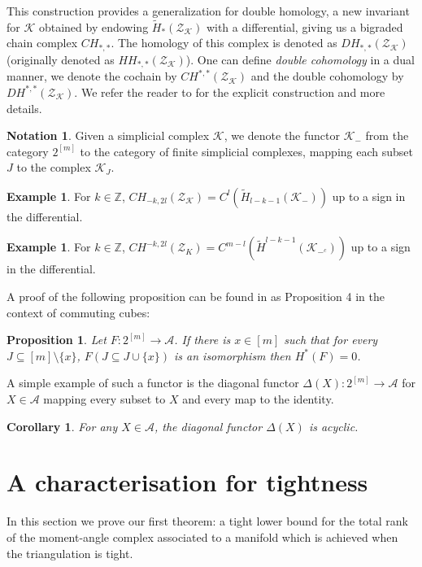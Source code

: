 \documentclass[a4paper]{amsart}
\newtheorem{prop}[thm]{Proposition}
\newtheorem{cor}[thm]{Corollary}
\theoremstyle{definition}
\newtheorem{exm}[thm]{Example}
\newtheorem{notation}[thm]{Notation}
\def\Z{\mathbb{Z}}    %
\def\K{\mathcal{K}}
\def\H{\tilde{H}}
\def\A{\mathcal{A}}
\def\ZZ{\mathcal{Z}}
\def\Z{\mathbb{Z}}
\begin{document}
This construction provides a generalization for double homology, a new invariant for $\K$ obtained by endowing $\H_*(\ZZ_\K)$ with a differential, giving us a bigraded chain complex $CH_{*,*}$. The homology of this complex is denoted as $DH_{*,*}(\ZZ_\K)$ (originally denoted as $HH_{*,*}(\ZZ_\K)$). One can define \textit{double cohomology} in a dual manner, we denote the cochain by $CH^{*,*}(\ZZ_\K)$ and the double cohomology by $DH^{*,*}(\ZZ_\K)$. We refer the reader to \cite{Limonchenko_2023} for the explicit construction and more details.
\begin{notation}
    Given a simplicial complex $\K$, we denote the functor $\K_-$ from the category $2^{[m]}$ to the category of finite simplicial complexes, mapping each subset $J$ to the complex $\K_J$.
\end{notation}
\begin{exm}
    For $k\in \Z$, $CH_{-k,2l}(\ZZ_\K)=C^l(\H_{l-k-1}(\K_-))$ up to a sign in the differential.
\end{exm}
\begin{exm}
    For $k\in \Z$, $CH^{-k,2l}(\ZZ_K)=C^{m-l}(\H^{l-k-1}(\K_{-^c}))$ up to a sign in the differential.
\end{exm}
A proof of the following proposition can be found in \cite[\S3.4]{jonespoly} as Proposition 4 in the context of commuting cubes:
\begin{prop}
    Let $F:2^{[m]}\to \A$. If there is $x\in[m]$ such that for every $J\subseteq [m]\setminus\{x\}$, $F(J\subseteq J\cup\{x\})$ is an isomorphism then $H^*(F)=0$.
\end{prop}
A simple example of such a functor is the diagonal functor $\Delta(X):2^{[m]}\to \A$ for $X\in \A$ mapping every subset to $X$ and every map to the identity.
\begin{cor}\label{acyclic}
    For any $X\in\A$, the diagonal functor $\Delta(X)$ is acyclic.
\end{cor}
\section{A characterisation for tightness}
In this section we prove our first theorem: a tight lower bound for the total rank of the moment-angle complex associated to a manifold which is achieved when the triangulation is tight.
\end{document}
